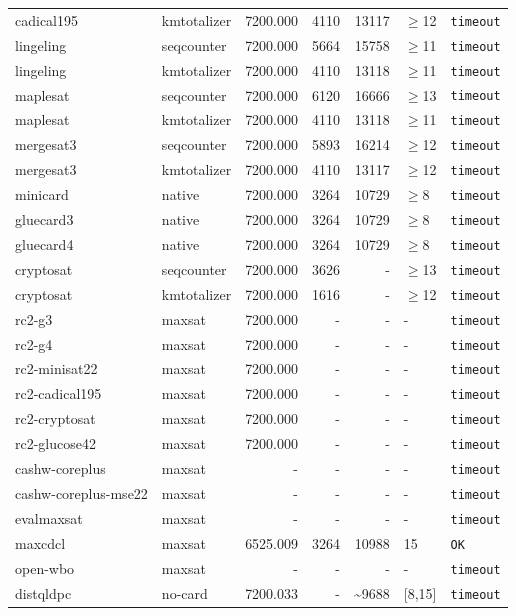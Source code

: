 \begin{longtable}{llrrrl p{}}
cadical195 & kmtotalizer & 7200.000 & 4110 & 13117 & $\geq$12 & \texttt{timeout} \\
lingeling & seqcounter & 7200.000 & 5664 & 15758 & $\geq$11 & \texttt{timeout} \\
lingeling & kmtotalizer & 7200.000 & 4110 & 13118 & $\geq$11 & \texttt{timeout} \\
maplesat & seqcounter & 7200.000 & 6120 & 16666 & $\geq$13 & \texttt{timeout} \\
maplesat & kmtotalizer & 7200.000 & 4110 & 13118 & $\geq$11 & \texttt{timeout} \\
mergesat3 & seqcounter & 7200.000 & 5893 & 16214 & $\geq$12 & \texttt{timeout} \\
mergesat3 & kmtotalizer & 7200.000 & 4110 & 13117 & $\geq$12 & \texttt{timeout} \\
minicard & native & 7200.000 & 3264 & 10729 & $\geq$8 & \texttt{timeout} \\
gluecard3 & native & 7200.000 & 3264 & 10729 & $\geq$8 & \texttt{timeout} \\
gluecard4 & native & 7200.000 & 3264 & 10729 & $\geq$8 & \texttt{timeout} \\
cryptosat & seqcounter & 7200.000 & 3626 & - & $\geq$13 & \texttt{timeout} \\
cryptosat & kmtotalizer & 7200.000 & 1616 & - & $\geq$12 & \texttt{timeout} \\
rc2-g3 & maxsat & 7200.000 & - & - & - & \texttt{timeout} \\
rc2-g4 & maxsat & 7200.000 & - & - & - & \texttt{timeout} \\
rc2-minisat22 & maxsat & 7200.000 & - & - & - & \texttt{timeout} \\
rc2-cadical195 & maxsat & 7200.000 & - & - & - & \texttt{timeout} \\
rc2-cryptosat & maxsat & 7200.000 & - & - & - & \texttt{timeout} \\
rc2-glucose42 & maxsat & 7200.000 & - & - & - & \texttt{timeout} \\
cashw-coreplus & maxsat & - & - & - & - & \texttt{timeout} \\
cashw-coreplus-mse22 & maxsat & - & - & - & - & \texttt{timeout} \\
evalmaxsat & maxsat & - & - & - & - & \texttt{timeout} \\
maxcdcl & maxsat & 6525.009 & 3264 & 10988 & 15 & \texttt{OK} \\
open-wbo & maxsat & - & - & - & - & \texttt{timeout} \\
distqldpc & no-card & 7200.033 & - & \textasciitilde{}9688 & [8,15] & \texttt{timeout} \\

\end{longtable}
